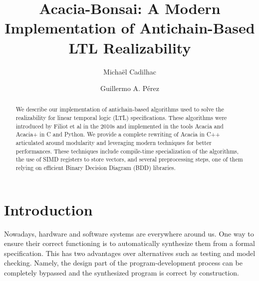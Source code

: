 \documentclass[sigconf,screen]{acmart}
\begin{document}
\title{Acacia-Bonsai: A Modern Implementation of Antichain-Based LTL Realizability}

\author{Michaël Cadilhac}

\author{Guillermo A. Pérez}

\begin{abstract}
  We describe our implementation of antichain-based algorithms used to solve the
  realizability for linear temporal logic (LTL) specifications.  These
  algorithms were introduced by Filiot et al in the 2010s and implemented in the
  tools Acacia and Acacia+ in C and Python.  We provide a complete rewriting of
  Acacia in C++ articulated around modularity and leveraging modern techniques
  for better performances.  These techniques include compile-time specialization
  of the algorithms, the use of SIMD registers to store vectors, and several
  preprocessing steps, one of them relying on efficient Binary Decision Diagram
  (BDD) libraries.
\end{abstract}


\maketitle

\section{Introduction}

Nowadays, hardware and software systems are everywhere around us. One way to
ensure their correct functioning is to automatically synthesize them from a
formal specification.  This has two advantages over alternatives such as
testing and model checking.  Namely, the design part of the
program-development process can be completely bypassed and the synthesized
program is correct by construction.
\end{document}
